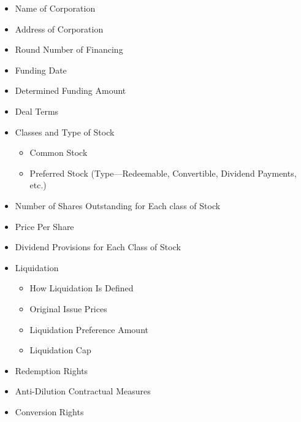\documentclass[
]{book}
\providecommand{\tightlist}{%
  \setlength{\itemsep}{0pt}\setlength{\parskip}{0pt}}
\begin{document}
\begin{itemize}
\tightlist
\item
  Name of Corporation\\
\item
  Address of Corporation\\
\item
  Round Number of Financing\\
\item
  Funding Date\\
\item
  Determined Funding Amount\\
\item
  Deal Terms\\
\item
  Classes and Type of Stock

  \begin{itemize}
  \tightlist
  \item
    Common Stock\\
  \item
    Preferred Stock (Type---Redeemable, Convertible, Dividend Payments, etc.)\\
  \end{itemize}
\item
  Number of Shares Outstanding for Each class of Stock\\
\item
  Price Per Share\\
\item
  Dividend Provisions for Each Class of Stock\\
\item
  Liquidation

  \begin{itemize}
  \tightlist
  \item
    How Liquidation Is Defined\\
  \item
    Original Issue Prices\\
  \item
    Liquidation Preference Amount\\
  \item
    Liquidation Cap\\
  \end{itemize}
\item
  Redemption Rights\\
\item
  Anti-Dilution Contractual Measures\\
\item
  Conversion Rights


\end{itemize}
\end{document}
